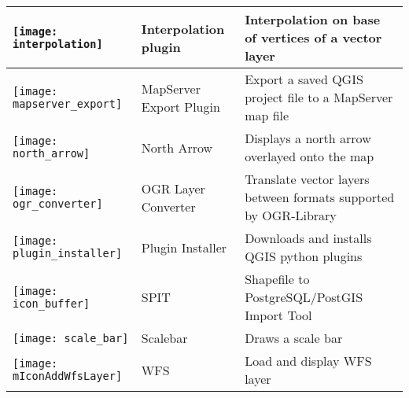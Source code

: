 \begin{minipage}{\textwidth}
\begin{table}[H]
\begin{tabular}{|l|l|p{4in}|}
\hline
\texttt{[image: interpolation]}
& Interpolation plugin \index{plugins!Interpolation}& Interpolation on base of vertices of a vector layer\\
\hline
\texttt{[image: mapserver\_export]}
& MapServer Export Plugin \index{plugins!MapServer Export}& Export a saved QGIS project file to a MapServer map file \\
\hline
\texttt{[image: north\_arrow]}
& North Arrow \index{plugins!north arrow}& Displays a north arrow overlayed onto the map\\
\hline
\texttt{[image: ogr\_converter]}
 & OGR Layer Converter \index{plugins!OGR converter} & Translate vector layers between formats supported by OGR-Library\\
\hline
\texttt{[image: plugin\_installer]}
 & Plugin Installer \index{plugins!Plugin Installer} & Downloads and installs QGIS python plugins\\
\hline
\texttt{[image: icon\_buffer]}
 & SPIT \index{plugins!spit}& Shapefile to PostgreSQL/PostGIS Import Tool \\
\hline
\texttt{[image: scale\_bar]}
 & Scalebar \index{plugins!scalebar}& Draws a scale bar\\
\hline
\texttt{[image: mIconAddWfsLayer]}
 & WFS & Load and display WFS layer \\
\hline
\end{tabular}
\end{table}
\end{minipage}

\normalsize

\begin{Tip}\caption{\textsc{Plugins Settings Saved to Project}}
\end{Tip}